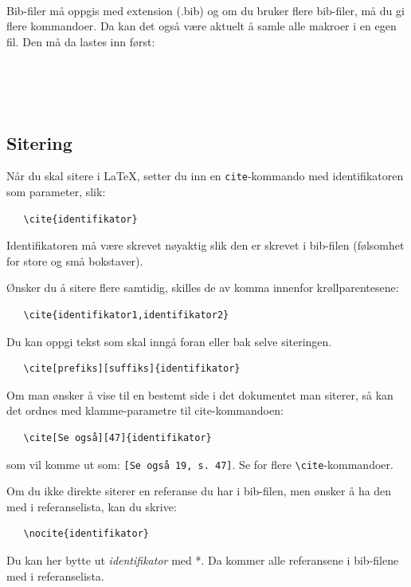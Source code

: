 \documentclass[11pt,norsk,a4paper]{article}
\begin{document}
{\footnotesize\begin{verbatim}
    
\end{verbatim}}
\noindent{}Bib-filer må oppgis med extension (.bib) og om du bruker flere
bib-filer, må du gi flere kommandoer. Da kan det også være aktuelt å samle
alle makroer i en egen fil. Den må da lastes inn først:

{\footnotesize\begin{verbatim}
    
    
    
\end{verbatim}}

\subsection{Sitering}
Når du skal sitere i \LaTeX, setter du inn en \texttt{cite}-kommando
med identifikatoren som parameter, slik:

{\footnotesize\begin{verbatim}
   \cite{identifikator}
\end{verbatim}}
\noindent{}Identifikatoren må være skrevet nøyaktig slik den er skrevet
i bib-filen (følsomhet for store og små bokstaver).

Ønsker du å sitere flere samtidig, skilles de av komma innenfor
krøllparentesene: 

{\footnotesize\begin{verbatim}
   \cite{identifikator1,identifikator2}
\end{verbatim}}
\noindent{}Du kan oppgi tekst som skal inngå foran eller bak selve
siteringen.

{\footnotesize\begin{verbatim}
   \cite[prefiks][suffiks]{identifikator}
\end{verbatim}}
\noindent{}Om man ønsker å vise til en bestemt side i det dokumentet
man siterer, så kan det ordnes med klamme-parametre til
cite-kommandoen:

{\footnotesize\begin{verbatim}
   \cite[Se også][47]{identifikator}
\end{verbatim}}
\noindent{}som vil komme ut som: \verb=[Se også 19, s. 47]=. Se \cite[][14]{langmyhr13} for flere \verb=\cite=-kommandoer.

Om du ikke direkte siterer en referanse du har i bib-filen,
men ønsker å ha den med i referanselista, kan du skrive:

{\footnotesize\begin{verbatim}
   \nocite{identifikator}
\end{verbatim}}
\noindent{}Du kan her bytte ut \textit{identifikator} med *. Da kommer alle
referansene i bib-filene med i referanselista.
\end{document}
